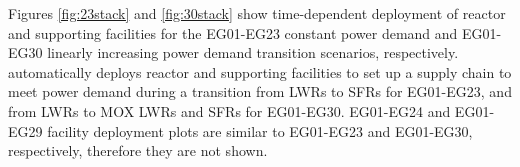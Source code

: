 Figures \ref{fig:23stack} and \ref{fig:30stack} show
time-dependent deployment of reactor and supporting facilities for 
the EG01-EG23 constant power demand and EG01-EG30 linearly increasing power demand 
transition scenarios, respectively. 
\deploy automatically deploys reactor and supporting facilities 
to set up a supply chain to meet power demand
during a transition from \glspl{LWR} to \glspl{SFR} for EG01-EG23, 
and from \glspl{LWR} to \gls{MOX} \glspl{LWR} and \glspl{SFR} for 
EG01-EG30. 
EG01-EG24 and EG01-EG29 facility deployment plots are similar to 
EG01-EG23 and EG01-EG30, respectively, therefore they are not shown. 

\begin{table}[]
	\centering
\end{table}
